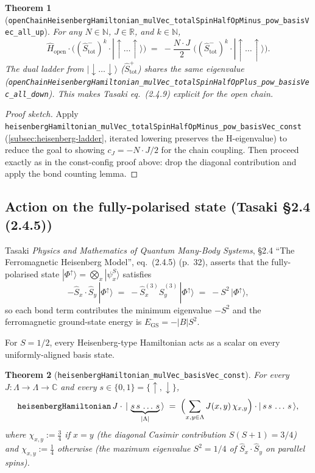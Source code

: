 \documentclass[a4paper,11pt]{article}
\newtheorem{theorem}{Theorem}
\begin{document}
\begin{theorem}[\texttt{openChainHeisenbergHamiltonian\_mulVec\_totalSpinHalfOpMinus\_pow\_basisVec\_all\_up}]
For any $N \in \mathbb{N}$, $J \in \mathbb{R}$, and $k \in \mathbb{N}$,
\[
  \hat H_{\mathrm{open}} \cdot
    \bigl((\hat S_{\mathrm{tot}}^{-})^{k} \cdot
            |{\uparrow}\dots{\uparrow}\rangle\bigr)
  \;=\;
  -\frac{N\cdot J}{2}\;
    \bigl((\hat S_{\mathrm{tot}}^{-})^{k} \cdot
            |{\uparrow}\dots{\uparrow}\rangle\bigr).
\]
The dual ladder from $|{\downarrow}\dots{\downarrow}\rangle$
($\hat S_{\mathrm{tot}}^{+}$) shares the same eigenvalue
(\texttt{openChainHeisenbergHamiltonian\_mulVec\_totalSpinHalfOpPlus\_pow\_basisVec\_all\_down}).
This makes Tasaki eq.~(2.4.9) explicit for the open chain.
\end{theorem}

\begin{proof}[Proof sketch]
Apply
\texttt{heisenbergHamiltonian\_mulVec\_totalSpinHalfOpMinus\_pow\_basisVec\_const}
(\ref{subsec:heisenberg-ladder}, iterated lowering preserves the
H-eigenvalue) to reduce the goal to showing $c_{J} = -N\cdot J/2$ for
the chain coupling.  Then proceed exactly as in the const-config
proof above: drop the diagonal contribution and apply the bond
counting lemma.
\end{proof}

\subsection{Action on the fully-polarised state (Tasaki §2.4 (2.4.5))}
\label{subsec:heisenberg-allup}

Tasaki \emph{Physics and Mathematics of Quantum Many-Body Systems},
§2.4 ``The Ferromagnetic Heisenberg Model'', eq.~(2.4.5) (p.~32),
asserts that the fully-polarised state
$|\Phi^{\uparrow}\rangle = \bigotimes_{x} |\psi_{x}^{S}\rangle$
satisfies
\[
  -\hat S_x \cdot \hat S_y \, |\Phi^{\uparrow}\rangle
  \;=\; -\hat S_x^{(3)} \hat S_y^{(3)} \, |\Phi^{\uparrow}\rangle
  \;=\; -S^{2}\, |\Phi^{\uparrow}\rangle,
\]
so each bond term contributes the minimum eigenvalue $-S^{2}$ and
the ferromagnetic ground-state energy is $E_{\mathrm{GS}}=-|B|S^{2}$.

For $S=1/2$, every Heisenberg-type Hamiltonian acts as a scalar on
every uniformly-aligned basis state.

\begin{theorem}[\texttt{heisenbergHamiltonian\_mulVec\_basisVec\_const}]
For every $J : \Lambda \to \Lambda \to \mathbb{C}$ and every
$s \in \{0,1\} = \{\uparrow,\downarrow\}$,
\[
  \texttt{heisenbergHamiltonian}\,J \cdot \,
    |\,\underbrace{s\,s\,\dots\,s}_{|\Lambda|}\,\rangle
  \;=\;
  \Bigl(\sum_{x,y\in\Lambda} J(x,y)\,
    \chi_{x,y}\Bigr) \cdot
    |\,s\,s\,\dots\,s\,\rangle,
\]
where $\chi_{x,y} := \tfrac{3}{4}$ if $x=y$ (the diagonal Casimir
contribution $S(S+1)=3/4$) and $\chi_{x,y}:=\tfrac{1}{4}$ otherwise
(the maximum eigenvalue $S^{2}=1/4$ of $\hat S_x\cdot\hat S_y$ on
parallel spins).
\end{theorem}
\end{document}
